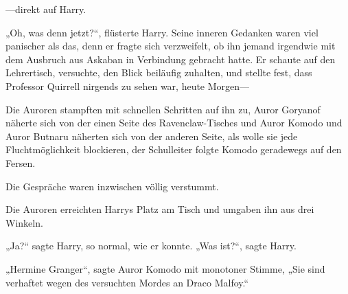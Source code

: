 —direkt auf Harry.

„Oh, was denn jetzt?“, flüsterte Harry. Seine inneren Gedanken waren viel panischer als das, denn er fragte sich verzweifelt, ob ihn jemand irgendwie mit dem Ausbruch aus Askaban in Verbindung gebracht hatte. Er schaute auf den Lehrertisch, versuchte, den Blick beiläufig zuhalten, und stellte fest, dass Professor Quirrell nirgends zu sehen war, heute Morgen—

Die Auroren stampften mit schnellen Schritten auf ihn zu, Auror Goryanof näherte sich von der einen Seite des Ravenclaw-Tisches und Auror Komodo und Auror Butnaru näherten sich von der anderen Seite, als wolle sie jede Fluchtmöglichkeit blockieren, der Schulleiter folgte Komodo geradewegs auf den Fersen.

Die Gespräche waren inzwischen völlig verstummt.

Die Auroren erreichten Harrys Platz am Tisch und umgaben ihn aus drei Winkeln.

„Ja?“ sagte Harry, so normal, wie er konnte. „Was ist?“, sagte Harry.

„Hermine Granger“, sagte Auror Komodo mit monotoner Stimme, „Sie sind verhaftet wegen des versuchten Mordes an Draco Malfoy.“

